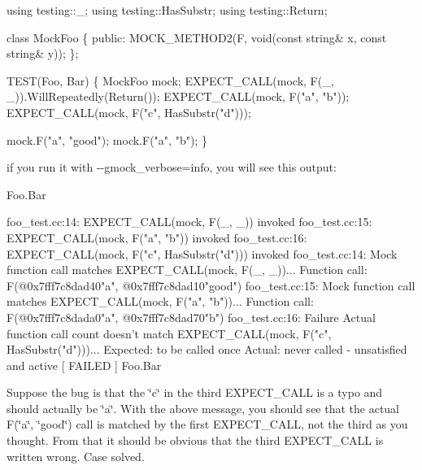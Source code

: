 \begin{DoxyCode}
\textcolor{keyword}{using} testing::\_;
\textcolor{keyword}{using} testing::HasSubstr;
\textcolor{keyword}{using} testing::Return;

\textcolor{keyword}{class }MockFoo \{
 \textcolor{keyword}{public}:
  MOCK\_METHOD2(F, \textcolor{keywordtype}{void}(\textcolor{keyword}{const} \textcolor{keywordtype}{string}& x, \textcolor{keyword}{const} \textcolor{keywordtype}{string}& y));
\};

TEST(Foo, Bar) \{
  MockFoo mock;
  EXPECT\_CALL(mock, F(\_, \_)).WillRepeatedly(Return());
  EXPECT\_CALL(mock, F(\textcolor{stringliteral}{"a"}, \textcolor{stringliteral}{"b"}));
  EXPECT\_CALL(mock, F(\textcolor{stringliteral}{"c"}, HasSubstr(\textcolor{stringliteral}{"d"})));

  mock.F(\textcolor{stringliteral}{"a"}, \textcolor{stringliteral}{"good"});
  mock.F(\textcolor{stringliteral}{"a"}, \textcolor{stringliteral}{"b"});
\}
\end{DoxyCode}


if you run it with {\ttfamily -\/-\/gmock\+\_\+verbose=info}, you will see this output\+:


\begin{DoxyCode}
[ RUN      ] Foo.Bar

foo\_test.cc:14: EXPECT\_CALL(mock, F(\_, \_)) invoked
foo\_test.cc:15: EXPECT\_CALL(mock, F("a", "b")) invoked
foo\_test.cc:16: EXPECT\_CALL(mock, F("c", HasSubstr("d"))) invoked
foo\_test.cc:14: Mock function call matches EXPECT\_CALL(mock, F(\_, \_))...
    Function call: F(@0x7fff7c8dad40"a", @0x7fff7c8dad10"good")
foo\_test.cc:15: Mock function call matches EXPECT\_CALL(mock, F("a", "b"))...
    Function call: F(@0x7fff7c8dada0"a", @0x7fff7c8dad70"b")
foo\_test.cc:16: Failure
Actual function call count doesn't match EXPECT\_CALL(mock, F("c", HasSubstr("d")))...
         Expected: to be called once
           Actual: never called - unsatisfied and active
[  FAILED  ] Foo.Bar
\end{DoxyCode}


Suppose the bug is that the {\ttfamily \char`\"{}c\char`\"{}} in the third {\ttfamily E\+X\+P\+E\+C\+T\+\_\+\+C\+A\+LL} is a typo and should actually be {\ttfamily \char`\"{}a\char`\"{}}. With the above message, you should see that the actual {\ttfamily F(\char`\"{}a\char`\"{}, \char`\"{}good\char`\"{})} call is matched by the first {\ttfamily E\+X\+P\+E\+C\+T\+\_\+\+C\+A\+LL}, not the third as you thought. From that it should be obvious that the third {\ttfamily E\+X\+P\+E\+C\+T\+\_\+\+C\+A\+LL} is written wrong. Case solved.

